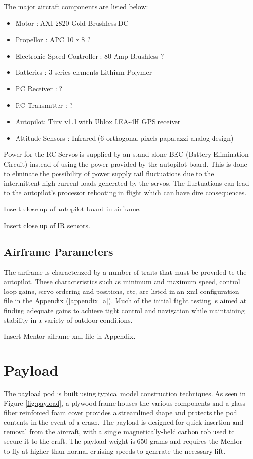 \documentclass[a4paper,11pt]{report}
\begin{document}
The major aircraft components are listed below:

\begin{itemize}
 \item Motor : AXI 2820 Gold Brushless DC
 \item Propellor : APC 10 x 8 ? 
 \item Electronic Speed Controller : 80 Amp Brushless ?
 \item Batteries : 3 series elements Lithium Polymer
 \item RC Receiver : ?
 \item RC Transmitter : ? 
 \item Autopilot: Tiny v1.1 with Ublox LEA-4H GPS receiver
 \item Attitude Sensors : Infrared (6 orthogonal pixels paparazzi analog design)
\end{itemize}

Power for the RC Servos is supplied by an stand-alone BEC (Battery Elimination Circuit) instead of using the power provided by the autopilot board. This is done to elminate the possibility of power supply rail fluctuations due to the intermittent high current loads generated by the servos. The fluctuations can lead to the autopilot's processor rebooting in flight which can have dire consequences.

Insert close up of autopilot board in airframe.

Insert close up of IR sensors.

\subsection{Airframe Parameters}

The airframe is characterized by a number of traits that must be provided to the autopilot. These characteristics such as minimum and maximum speed, control loop gains, servo ordering and positions, etc, are listed in an xml configuration file in the Appendix (\ref{appendix_a}). Much of the initial flight testing is aimed at finding adequate gains to achieve tight control and navigation while maintaining stability in a variety of outdoor conditions.

Insert Mentor aiframe xml file in Appendix.

\section{Payload}

The payload pod is built using typical model construction techniques. As seen in Figure \ref{fig:payload}, a plywood frame houses the various components and a glass-fiber reinforced foam cover provides a streamlined shape and protects the pod contents in the event of a crash. The payload is designed for quick insertion and removal from the aircraft, with a single magnetically-held carbon rob used to secure it to the craft. The payload weight is 650 grams and requires the Mentor to fly at higher than normal cruising speeds to generate the necessary lift. 
\end{document}
